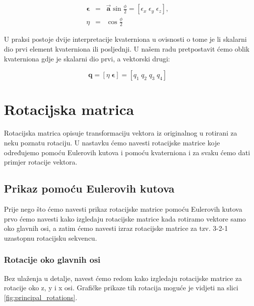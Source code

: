 \documentclass[times, utf8, diplomski, numeric]{templates/template}
\begin{document}
{{        \begin{equation}
        \label{eq:kvaternion}
        \begin{array}{rcl}
            \boldsymbol\epsilon &  = & \overrightarrow{\boldsymbol{a}}\sin\frac{\phi}{2} = \left[\epsilon_{x} \; \epsilon_{y} \; \epsilon_{z} \right], \\
            \eta & = & \cos\frac{\phi}{2}
        \end{array}
        \end{equation}

        U praksi postoje dvije interpretacije kvaterniona u ovisnosti o tome je li skalarni dio prvi element kvaterniona ili posljednji. U našem radu pretpostavit ćemo oblik kvaterniona gdje je skalarni dio prvi, a vektorski drugi:

        \begin{equation}
        \label{eq:kvaternion_elem}
            \boldsymbol{q}=
            \left[\eta \; \boldsymbol\epsilon \right] = \left[q_{1} \; q_{2} \; q_{3} \; q_{4}\right]
        \end{equation}
    }

    \section{Rotacijska matrica}{
        Rotacijska matrica opisuje transformaciju vektora iz originalnog u rotirani za neku poznatu rotaciju. U nastavku ćemo navesti rotacijske matrice koje određujemo pomoću Eulerovih kutova i pomoću kvaterniona i za svaku ćemo dati primjer rotacije vektora.

        \subsection{Prikaz pomoću Eulerovih kutova}{
            Prije nego što ćemo navesti prikaz rotacijske matrice pomoću Eulerovih kutova prvo ćemo navesti kako izgledaju rotacijske matrice kada rotiramo vektore samo oko glavnih osi, a zatim ćemo navesti izraz rotacijske matrice za tzv. 3-2-1 uzastopnu rotacijsku sekvencu.

            \subsubsection{Rotacije oko glavnih osi}{
                Bez ulaženja u detalje, navest ćemo redom kako izgledaju rotacijske matrice za rotacije oko z, y i x osi. Grafičke prikaze tih rotacija moguće je vidjeti na slici \ref{fig:principal_rotations}.

}}}}
\end{document}
